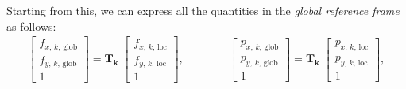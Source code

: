 Starting from this, we can express all the quantities in the \textit{global reference frame} as follows:
\begin{align}
    \begin{bmatrix}
        f_{x,\,k,\,\text{glob} } \\
        f_{y,\,k,\,\text{glob}} \\[1ex]
        1
    \end{bmatrix}
    = \mathbf{T_k} \;
    \begin{bmatrix}
        f_{x,\,k,\,\text{loc} } \\
        f_{y,\,k,\,\text{loc}} \\[1ex]
        1
    \end{bmatrix},\qquad \qquad
    \begin{bmatrix}
        p_{x,\,k,\,\text{glob} } \\
        p_{y,\,k,\,\text{glob}} \\[1ex]
        1
    \end{bmatrix}
    = \mathbf{T_k} \;
    \begin{bmatrix}
        p_{x,\,k,\,\text{loc} } \\
        p_{y,\,k,\,\text{loc}} \\[1ex]
        1
    \end{bmatrix},
\end{align}

